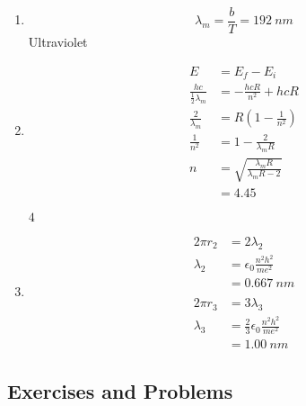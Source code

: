 \documentclass{article}
\begin{document}
\begin{enumerate}
  \item \[\lambda_m = \frac{b}{T} = \qty{192}{nm}\] Ultraviolet

  \item

        \begin{align*}
          E                                 & = E_f - E_i                                  \\
          \frac{h c}{\frac{1}{2} \lambda_m} & = -\frac{h c R}{n^2} + h c R                 \\
          \frac{2}{\lambda_m}               & = R \left( 1 - \frac{1}{n^2} \right)         \\
          \frac{1}{n^2}                     & = 1 - \frac{2}{\lambda_m R}                  \\
          n                                 & = \sqrt{\frac{\lambda_m R}{\lambda_m R - 2}} \\
                                            & = 4.45
        \end{align*}

        $4$

  \item

        \begin{align*}
          2 \pi r_2 & = 2 \lambda_2                                  \\
          \lambda_2 & = \epsilon_0 \frac{n^2 h^2}{m e^2}             \\
                    & = \qty{0.667}{nm}                              \\ \\
          2 \pi r_3 & = 3 \lambda_3                                  \\
          \lambda_3 & = \frac{2}{3} \epsilon_0 \frac{n^2 h^2}{m e^2} \\
                    & = \qty{1.00}{nm}
        \end{align*}
\end{enumerate}

\subsection{Exercises and Problems}

\subsubsection{}
\end{document}
